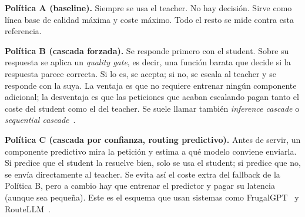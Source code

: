 \documentclass[11pt,a4paper]{article}
\begin{document}
\textbf{Política A (baseline).} Siempre se usa el teacher. No hay decisión. Sirve como línea base de calidad máxima y coste máximo. Todo el resto se mide contra esta referencia.

\textbf{Política B (cascada forzada).} Se responde primero con el student. Sobre su respuesta se aplica un \textit{quality gate}, es decir, una función barata que decide si la respuesta parece correcta. Si lo es, se acepta; si no, se escala al teacher y se responde con la suya. La ventaja es que no requiere entrenar ningún componente adicional; la desventaja es que las peticiones que acaban escalando pagan tanto el coste del student como el del teacher. Se suele llamar también \textit{inference cascade} o \textit{sequential cascade}~\cite{chen2023frugalgpt}.

\textbf{Política C (cascada por confianza, routing predictivo).} Antes de servir, un componente predictivo mira la petición y estima a qué modelo conviene enviarla. Si predice que el student la resuelve bien, solo se usa el student; si predice que no, se envía directamente al teacher. Se evita así el coste extra del fallback de la Política B, pero a cambio hay que entrenar el predictor y pagar su latencia (aunque sea pequeña). Este es el esquema que usan sistemas como FrugalGPT~\cite{chen2023frugalgpt} y RouteLLM~\cite{dekoninck2024routing}.
\end{document}
